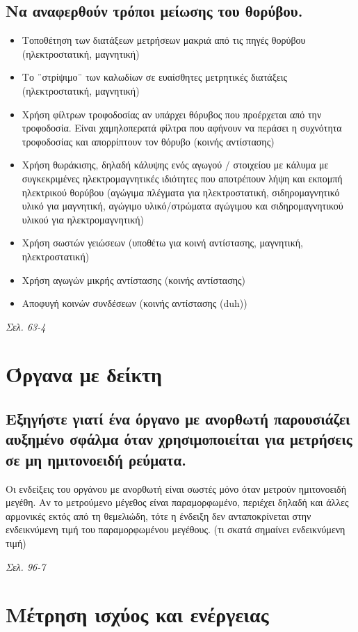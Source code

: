 \documentclass{article}
\begin{document}
\subsection{Να αναφερθούν τρόποι μείωσης του θορύβου.}
\begin{itemize}
    \item Τοποθέτηση των διατάξεων μετρήσεων μακριά από τις πηγές θορύβου (ηλεκτροστατική, μαγνητική)
    \item Το ¨στρίψιμο¨ των καλωδίων σε ευαίσθητες μετρητικές διατάξεις (ηλεκτροστατική, μαγνητική)
    \item Χρήση φίλτρων τροφοδοσίας αν υπάρχει θόρυβος που προέρχεται από την τροφοδοσία. Είναι χαμηλοπερατά φίλτρα που αφήνουν να περάσει η συχνότητα τροφοδοσίας και απορρίπτουν τον θόρυβο (κοινής αντίστασης)
    \item Χρήση θωράκισης, δηλαδή κάλυψης ενός αγωγού / στοιχείου με κάλυμα με συγκεκριμένες ηλεκτρομαγνητικές ιδιότητες που αποτρέπουν λήψη και εκπομπή ηλεκτρικού θορύβου (αγώγιμα πλέγματα για ηλεκτροστατική, σιδηρομαγνητικό υλικό για μαγνητική, αγώγιμο υλικό/στρώματα αγώγιμου και σιδηρομαγνητικού υλικού για ηλεκτρομαγνητική)
    \item Χρήση σωστών γειώσεων (υποθέτω για κοινή αντίστασης, μαγνητική, ηλεκτροστατική)
    \item Χρήση αγωγών μικρής αντίστασης (κοινής αντίστασης)
    \item Αποφυγή κοινών συνδέσεων (κοινής αντίστασης \foreignlanguage{english}{(duh)}) 
\end{itemize}
\emph{Σελ. 63-4}

\section{Όργανα με δείκτη}
\subsection{Εξηγήστε γιατί ένα όργανο με ανορθωτή παρουσιάζει αυξημένο σφάλμα όταν χρησιμοποιείται για μετρήσεις σε μη ημιτονοειδή ρεύματα.}
Οι ενδείξεις του οργάνου με ανορθωτή είναι σωστές μόνο όταν μετρούν ημιτονοειδή μεγέθη. Αν το μετρούμενο μέγεθος είναι παραμορφωμένο, περιέχει δηλαδή και άλλες αρμονικές
εκτός από τη θεμελιώδη, τότε η ένδειξη δεν ανταποκρίνεται στην ενδεικνύμενη τιμή του παραμορφωμένου μεγέθους. (τι σκατά σημαίνει ενδεικνύμενη τιμή)

\emph{Σελ. 96-7}

\section{Μέτρηση ισχύος και ενέργειας}
\end{document}
